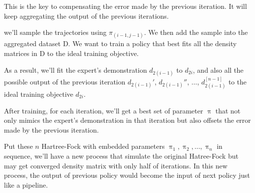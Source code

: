 \documentclass[twoside]{article}
\begin{document}
This is the key to compensating the error made by the previous iteration. It will keep aggregating the output of the previous iterations.











we'll  sample the trajectories using $\hat{\pi}_{(i-1,j-1)}$. We then add the sample into the aggregated dataset D.
We want to train a policy that best fits all the density matrices in D to the ideal training objective.

As a result, we'll fit the expert's demonstration $d_{2(i-1)}$ to $d_{2i}$, and also  all the possible output of the previous iteration $d_{2(i-1)}'$,  $d_{2(i-1)}''$, $\ldots$,  $d_{2(i-1)}^{[n-1]}$  to the ideal training objective $d_{2i}$.

After training, for each iteration, we'll get a best set of parameter $\uppi$ that not only mimics the expert's demonstration in that iteration but also offsets the error made by the previous iteration.

% 
Put these $n$ Hartree-Fock with embedded parameters $\uppi_1, \uppi_2, \ldots, \uppi_n$ in sequence, we'll have a new process that simulate the original Hatree-Fock but may get converged density matrix with only half of iterations. In this new process, the output of previous policy would become the input of next policy just like a pipeline. 

\end{document}
